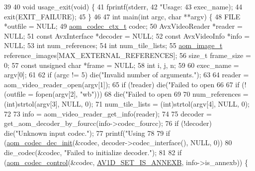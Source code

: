 \begin{DoxyCodeInclude}
39 
40 \textcolor{keywordtype}{void} usage\_exit(\textcolor{keywordtype}{void}) \{
41   fprintf(stderr,
42           \textcolor{stringliteral}{"Usage: %
43           exec\_name);
44   exit(EXIT\_FAILURE);
45 \}
46 
47 \textcolor{keywordtype}{int} main(\textcolor{keywordtype}{int} argc, \textcolor{keywordtype}{char} **argv) \{
48   FILE *outfile = NULL;
49   \hyperlink{structaom__codec__ctx}{aom\_codec\_ctx\_t} codec;
50   AvxVideoReader *reader = NULL;
51   \textcolor{keyword}{const} AvxInterface *decoder = NULL;
52   \textcolor{keyword}{const} AvxVideoInfo *info = NULL;
53   \textcolor{keywordtype}{int} num\_references;
54   \textcolor{keywordtype}{int} num\_tile\_lists;
55   \hyperlink{structaom__image}{aom\_image\_t} reference\_images[MAX\_EXTERNAL\_REFERENCES];
56   \textcolor{keywordtype}{size\_t} frame\_size = 0;
57   \textcolor{keyword}{const} \textcolor{keywordtype}{unsigned} \textcolor{keywordtype}{char} *frame = NULL;
58   \textcolor{keywordtype}{int} i, j, n;
59 
60   exec\_name = argv[0];
61 
62   \textcolor{keywordflow}{if} (argc != 5) die(\textcolor{stringliteral}{"Invalid number of arguments."});
63 
64   reader = aom\_video\_reader\_open(argv[1]);
65   \textcolor{keywordflow}{if} (!reader) die(\textcolor{stringliteral}{"Failed to open %
66 
67   \textcolor{keywordflow}{if} (!(outfile = fopen(argv[2], \textcolor{stringliteral}{"wb"})))
68     die(\textcolor{stringliteral}{"Failed to open %
69 
70   num\_references = (int)strtol(argv[3], NULL, 0);
71   num\_tile\_lists = (int)strtol(argv[4], NULL, 0);
72 
73   info = aom\_video\_reader\_get\_info(reader);
74 
75   decoder = get\_aom\_decoder\_by\_fourcc(info->codec\_fourcc);
76   \textcolor{keywordflow}{if} (!decoder) die(\textcolor{stringliteral}{"Unknown input codec."});
77   printf(\textcolor{stringliteral}{"Using %
78 
79   \textcolor{keywordflow}{if} (\hyperlink{group__decoder_gafdbfca65b19ab1f6d72b32cd01753b9b}{aom\_codec\_dec\_init}(&codec, decoder->codec\_interface(), NULL, 0))
80     die\_codec(&codec, \textcolor{stringliteral}{"Failed to initialize decoder."});
81 
82   \textcolor{keywordflow}{if} (\hyperlink{group__codec_ga6da974f4eeaba1fa74106b28d0fe6ac5}{aom\_codec\_control}(&codec, \hyperlink{group__aom__decoder_gga3865fd4b3192489baa9a5c3632ebe97ba1fb269c5c5913d9995b6c35d28e2a788}{AV1D\_SET\_IS\_ANNEXB}, info->is\_annexb)) \{
}}}}
\end{DoxyCodeInclude}
